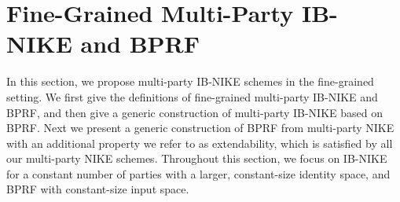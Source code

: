\section{Fine-Grained Multi-Party IB-NIKE and BPRF}
\label{sec:ibnike}
In this section, we propose multi-party IB-NIKE schemes in the fine-grained setting. We first give the definitions of fine-grained multi-party IB-NIKE and BPRF, and then give a generic construction of multi-party IB-NIKE based on BPRF. Next we present a generic construction of BPRF from multi-party NIKE with an additional property we refer to as extendability, which is satisfied by all our multi-party NIKE schemes. Throughout this section, we focus on IB-NIKE for a constant number of parties with a larger, constant-size identity space, and BPRF with constant-size input space.

